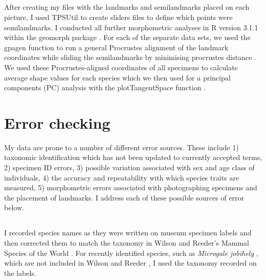 
\subsection{}
\label{sect:procrustes}

	After creating my files with the landmarks and semilandmarks placed on each picture, I used TPSUtil \citep{Rohlf2012} to create sliders files \citep{Zelditch2012} to define which points were semilandmarks. I conducted all further morphometric analyses in R version 3.1.1 \citep{Team2014} within the geomorph package \citep{Adams2013}.
	For each of the separate data sets, we used the gpagen function to run a general Procrustes alignment \citep{Rohlf1993} of the landmark coordinates while sliding the semilandmarks by minimising procrustes distance \citep{Bookstein1997}.
	We used these Procrustes-aligned coordinates of all specimens to calculate average shape values for each species which we then used for a principal components (PC) analysis with the plotTangentSpace function \citep{Adams2013}. 




\section{Error checking}
\label{sect:errors}
	My data are prone to a number of different error sources. These include 1) taxonomic identification which has not been updated to currently accepted terms, 2) specimen ID errors, 3) possible variation associated with sex and age class of individuals, 4) the accuracy and repeatability with which species traits are measured, 5) morphometric errors associated with photographing specimens and the placement of landmarks. I address each of these possible sources of error below.  

\subsection{}
	I recorded species names as they were written on museum specimen labels and then corrected them to match the taxonomy in Wilson and Reeder's Mammal Species of the World \citeyearpar{Wilson2005}. For recently identified species, such as \textit{Microgale jobihely} \citep{Goodman2006}, which are not included in Wilson and Reeder \citeyearpar{Wilson2005}, I used the taxonomy recorded on the labels. 

